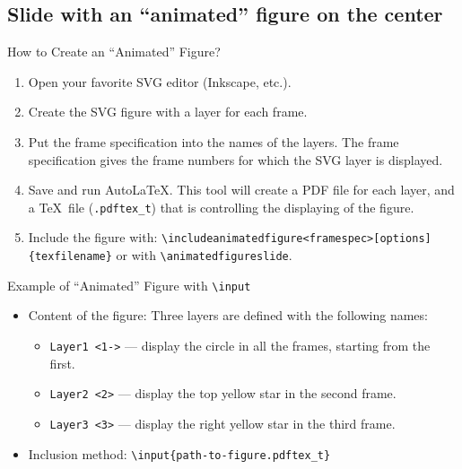 \documentclass[english,sectioncirclenumberstyle]{ciadbeamer}
\begin{document}

\subsection{Slide with an ``animated'' figure on the center}
\subsectiontableofcontentslide

\begin{frame}{How to Create an ``Animated'' Figure?}
	\smaller
	\begin{enumerate}
	\item Open your favorite SVG editor (Inkscape, etc.).
	\item Create the SVG figure with a layer for each frame.
	\item Put the frame specification into the names of the layers. The frame specification gives the frame numbers for which the SVG layer is displayed. 
	\item Save and run AutoLaTeX. This tool will create a PDF file for each layer, and a \TeX\ file (\texttt{.pdftex\string_t}) that is controlling the displaying of the figure.
	\item Include the figure with: \texttt{{\textbackslash}includeanimatedfigure<framespec>[options]\{texfilename\}} or with \texttt{{\textbackslash}animatedfigureslide}.
	\end{enumerate}
\end{frame}

\begin{frame}{Example of ``Animated'' Figure with \texttt{{\textbackslash}input}}
	\begin{itemize}
	\item Content of the figure: Three layers are defined with the following names:
		\begin{itemize}
		\item \texttt{Layer1 <1->} --- display the circle in all the frames, starting from the first.
		\item \texttt{Layer2 <2>} --- display the top yellow star in the second frame.
		\item \texttt{Layer3 <3>} --- display the right yellow star in the third frame.
		\end{itemize}
	\item Inclusion method: \texttt{{\textbackslash}input\{path-to-figure.pdftex\string_t\}}
	\end{itemize}
	\begin{center}
	\end{center}
\end{frame}
\end{document}
